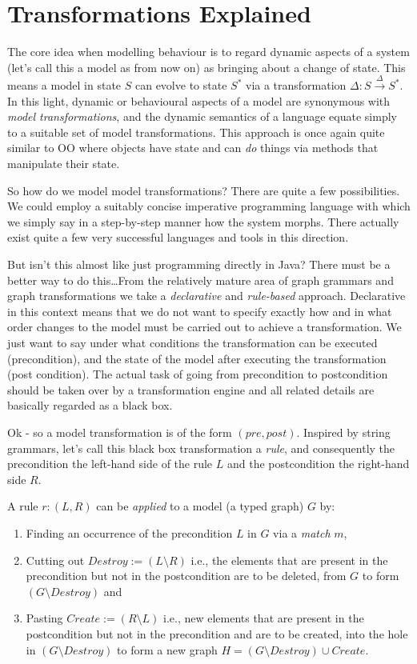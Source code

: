 \genHeader
\section{Transformations Explained}

The core idea when modelling behaviour is to regard dynamic aspects of a system (let's call this a model as from now on) as bringing about a change of state.
This means a model in state $S$ can evolve to state $S^*$ via a transformation $\Delta: S \stackrel{\Delta}{\rightarrow}S^*$. In this light, dynamic or
behavioural aspects of a model are synonymous with \emph{model transformations}, and the dynamic semantics of a language equate simply to a suitable set of
model transformations. This approach is once again quite similar to OO where objects have state and can \emph{do} things via methods that manipulate their
state.

So how do we model model transformations?  There are quite a few possibilities. We could employ a suitably concise imperative programming language with which we
simply say in a step-by-step manner how the system morphs.
There actually exist quite a few very successful languages and tools in this direction.

But isn't this almost like just programming directly in Java? There must be a better way to do this\ldots From the relatively mature area of graph grammars and
graph transformations we take a \emph{declarative} and \emph{rule-based} approach. Declarative in this context means that we do not want to specify exactly how
and in what order changes to the model must be carried out to achieve a transformation. We just want to say under what conditions the transformation can be
executed (precondition), and the state of the model after executing the transformation (post condition). The actual task of going from precondition to
postcondition should  be taken over by a transformation engine and all related details are basically regarded as a black box.

Ok - so a model transformation is of the form $(pre, post)$.  Inspired by string grammars, let's call this black box transformation a \emph{rule}, and
consequently the precondition the left-hand side of the rule $L$ and the postcondition the right-hand side $R$.

A rule $r: (L,R)$ can be \emph{applied} to a model (a typed graph) $G$ by:
\begin{enumerate}
  \item Finding an occurrence of the precondition $L$ in $G$ via a \emph{match}
  $m$,
  \item Cutting out $Destroy := (L\setminus R)$ i.e., the elements that are
  present in the precondition but not in the postcondition are to be deleted,
  from $G$ to form  $(G\setminus Destroy)$ and
  \item Pasting $Create := (R\setminus L)$ i.e., new elements that are
  present in the postcondition but not in the precondition and are to be
  created, into the hole in $(G\setminus Destroy)$ to form a new graph $H =
  (G\setminus Destroy) \cup Create$.
\end{enumerate}

